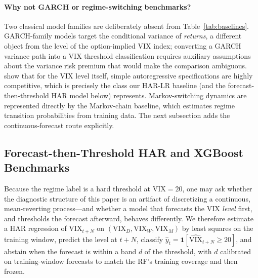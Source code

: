 \documentclass[12pt]{article}
\begin{document}
\paragraph{Why not GARCH or regime-switching benchmarks?}
Two classical model families are deliberately absent from Table~\ref{tab:baselines}.
GARCH-family models target the conditional variance of \emph{returns}, a different object from
the level of the option-implied VIX index; converting a GARCH variance path into a VIX
threshold classification requires auxiliary assumptions about the variance risk premium that
would make the comparison ambiguous. \citet{fernandes2014} show that for the VIX level itself,
simple autoregressive specifications are highly competitive, which is precisely the class our
HAR-LR baseline (and the forecast-then-threshold HAR model below) represents.
Markov-switching dynamics are represented directly by the Markov-chain baseline, which
estimates regime transition probabilities from training data. The next subsection adds the
continuous-forecast route explicitly.

\subsection{Forecast-then-Threshold HAR and XGBoost Benchmarks}
\label{sec:new_benchmarks}

Because the regime label is a hard threshold at $\text{VIX} = 20$, one may ask whether the
diagnostic structure of this paper is an artifact of discretizing a continuous, mean-reverting
process---and whether a model that forecasts the VIX \emph{level} first, and thresholds the
forecast afterward, behaves differently. We therefore estimate a HAR regression of
$\text{VIX}_{t+N}$ on $(\text{VIX}_D, \text{VIX}_W, \text{VIX}_M)$ by least squares on the
training window, predict the level at $t + N$, classify
$\hat{y}_t = \mathbf{1}[\widehat{\text{VIX}}_{t+N} \geq 20]$, and abstain when the forecast is
within a band $d$ of the threshold, with $d$ calibrated on training-window forecasts to match
the RF's training coverage and then frozen.
\end{document}
